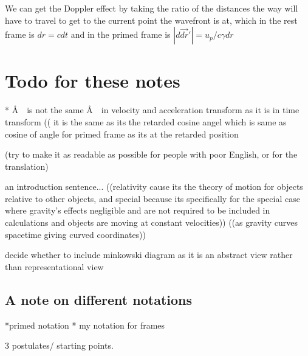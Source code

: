 We can get the Doppler effect by taking the ratio of the distances the way will have to travel to get to the current point the wavefront is at, which in the rest frame is $dr=cdt$ and in the primed frame is $|d\vec{dr}'| = u_p/c \gamma dr$
\chapter{Todo for these notes}
* \AA \ \ is not the same \AA \ \ in velocity and acceleration transform as it is in time transform (( it is the same as its the retarded cosine angel which is same as cosine of angle for primed frame as its at the retarded position

(try to make it as readable as possible for people with poor English, or for the translation)

an introduction sentence... ((relativity cause its the theory of motion for objects relative to other objects, and special because its specifically for the special case where gravity's effects negligible and are not required to be included in calculations and objects are moving at constant velocities)) ((as gravity curves spacetime giving curved coordinates))

decide whether to include minkowski diagram as it is an abstract view rather than representational view

\section{A note on different notations}
*primed notation
* my notation for frames

3 postulates/ starting points.